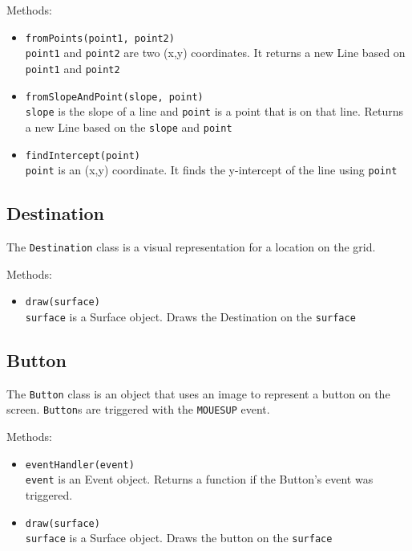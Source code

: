 \documentclass[12pt,letterpaper]{article}
\begin{document}
        \noindent Methods:
        \begin{itemize}
            \item \texttt{fromPoints(point1, point2)} \\
                \texttt{point1} and \texttt{point2} are two (x,y) coordinates. It returns a new Line based on \texttt{point1} and \texttt{point2}
            \item \texttt{fromSlopeAndPoint(slope, point)} \\
                \texttt{slope} is the slope of a line and \texttt{point} is a point that is on that line. Returns a new Line based on the \texttt{slope} and \texttt{point}
            \item \texttt{findIntercept(point)} \\
                \texttt{point} is an (x,y) coordinate. It finds the y-intercept of the line using \texttt{point}
        \end{itemize}
        
    \subsection{Destination}
        The \texttt{Destination} class is a visual representation for a location on the grid.
                
        \noindent Methods:
        \begin{itemize}
            \item \texttt{draw(surface)} \\
                \texttt{surface} is a Surface object. Draws the Destination on the \texttt{surface}
        \end{itemize}

    \subsection{Button}
        The \texttt{Button} class is an object that uses an image to represent a button on the screen. \texttt{Button}s are triggered with the \texttt{MOUESUP} event.
        
        \noindent Methods:
        \begin{itemize}
            \item \texttt{eventHandler(event)} \\
                \texttt{event} is an Event object. Returns a function if the Button's event was triggered.
            \item \texttt{draw(surface)} \\
                \texttt{surface} is a Surface object. Draws the button on the \texttt{surface}
        \end{itemize}
        
\end{document}
